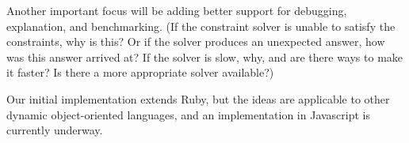 Another important focus will be adding better support for
debugging, explanation, and benchmarking.  (If the constraint solver
is unable to satisfy the constraints, why is this?  Or if the solver
produces an unexpected answer, how was this answer arrived at?  If the
solver is slow, why, and are there ways to make it faster?  Is there a
more appropriate solver available?)

Our initial implementation extends Ruby, but the ideas are applicable
to other dynamic object-oriented languages, and an implementation in
Javascript is currently underway.




